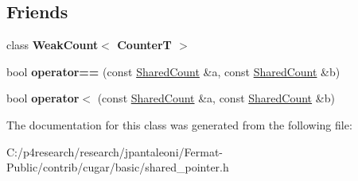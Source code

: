 \subsection*{Friends}
\begin{DoxyCompactItemize}
\item 
\mbox{\label{classcugar_1_1internals_1_1_shared_count_a3fe0176358dcda4a5e4afc36ad0134e9}} 
class {\bfseries Weak\+Count$<$ Counter\+T $>$}
\item 
\mbox{\label{classcugar_1_1internals_1_1_shared_count_a2b979bc7691a5441774ebb2da938b9b2}} 
bool {\bfseries operator==} (const \hyperlink{classcugar_1_1internals_1_1_shared_count}{Shared\+Count} \&a, const \hyperlink{classcugar_1_1internals_1_1_shared_count}{Shared\+Count} \&b)
\item 
\mbox{\label{classcugar_1_1internals_1_1_shared_count_a5ebb3c5c640d0cf2447bed1d7f5ba907}} 
bool {\bfseries operator$<$} (const \hyperlink{classcugar_1_1internals_1_1_shared_count}{Shared\+Count} \&a, const \hyperlink{classcugar_1_1internals_1_1_shared_count}{Shared\+Count} \&b)
\end{DoxyCompactItemize}


The documentation for this class was generated from the following file\+:\begin{DoxyCompactItemize}
\item 
C\+:/p4research/research/jpantaleoni/\+Fermat-\/\+Public/contrib/cugar/basic/shared\+\_\+pointer.\+h\end{DoxyCompactItemize}
